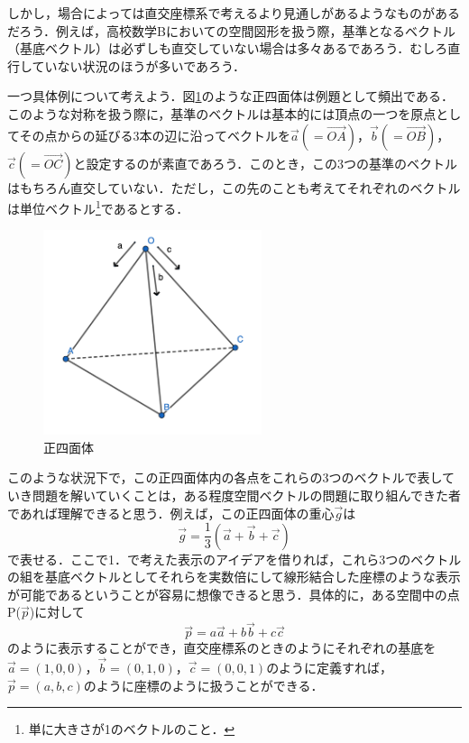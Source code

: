 \documentclass[dvipdfmx,a4]{jsarticle}
\begin{document}
しかし，場合によっては直交座標系で考えるより見通しがあるようなものがあるだろう．例えば，高校数学Bにおいての空間図形を扱う際，基準となるベクトル（基底ベクトル）は必ずしも直交していない場合は多々あるであろう．むしろ直行していない状況のほうが多いであろう．

一つ具体例について考えよう．図\ref{fig1}のような正四面体は例題として頻出である．このような対称を扱う際に，基準のベクトルは基本的には頂点の一つを原点としてその点からの延びる3本の辺に沿ってベクトルを\(\vec{a}(=\overrightarrow{OA})\)，\(\vec{b}(=\overrightarrow{OB})\)，\(\vec{c}(=\overrightarrow{OC})\)と設定するのが素直であろう．このとき，この3つの基準のベクトルはもちろん直交していない．ただし，この先のことも考えてそれぞれのベクトルは単位ベクトル\footnote{単に大きさが1のベクトルのこと．}であるとする．


\begin{figure}[tbh]
  \centering
  \includegraphics[height=6cm]{fig/fig1.png}
  \caption{正四面体}
  \label{fig1}
\end{figure}

このような状況下で，この正四面体内の各点をこれらの3つのベクトルで表していき問題を解いていくことは，ある程度空間ベクトルの問題に取り組んできた者であれば理解できると思う．例えば，この正四面体の重心\(\vec{g}\)は
\begin{equation*}
  \vec{g} = \dfrac{1}{3}\left( \vec{a}+\vec{b}+\vec{c} \right)
\end{equation*}
で表せる．ここで1．で考えた表示のアイデアを借りれば，これら3つのベクトルの組を基底ベクトルとしてそれらを実数倍にして線形結合した座標のような表示が可能であるということが容易に想像できると思う．具体的に，ある空間中の点P(\(\vec{p}\))に対して
\begin{equation*}
  \vec{p} = a \vec{a} + b \vec{b} +c \vec{c}
\end{equation*}
のように表示することができ，直交座標系のときのようにそれぞれの基底を\(\vec{a}=(1,0,0)\)，\(\vec{b}=(0,1,0)\)，\(\vec{c}=(0,0,1)\)のように定義すれば，\(\vec{p} =(a,b,c)\)のように座標のように扱うことができる．
\end{document}
